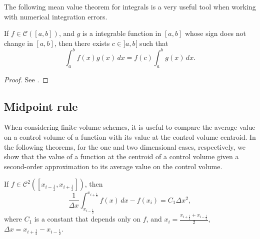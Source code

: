 The following mean value theorem for integrals is a very useful tool 
when working with numerical integration errors.
\begin{thrm}
	\label{anexo-numint-mv}
	If $f \in \mathcal{C}([a,b])$, and $g$ is a integrable function in $[a,b]$
	whose sign does not change in $[a,b]$,
	then there exists $c \in ]a,b[$ such that
	\begin{equation*}
		\int_{a}^{b}f(x)g(x) \,dx = f(c)\int_{a}^{b}g(x) \,dx.
	\end{equation*}
\end{thrm}
\begin{proof}
	See \citet[\pno~143]{courant:1999}.
\end{proof}

\subsection{Midpoint rule}
When considering finite-volume schemes, it is useful to compare the average value on a  control volume 
of a function with its value at the  control volume centroid. 
In the following theorems, for the one and two dimensional cases, respectively,
we show that the value of a function at the centroid of a control volume given a second-order approximation to its average value
on the control volume.
\begin{thrm}
	\label{prop-bound-midpoint1d}
	If $f \in \mathcal{C}^2([x_{i-\frac{1}{2}},x_{i+\frac{1}{2}}])$, then 
	\begin{equation}
		\frac{1}{\Delta x}\int_{x_{i-\frac{1}{2}}}^{x_{i+\frac{1}{2}}}{f(x)\,dx}-f(x_i) = C_1 \Delta x^2, 
	\end{equation}
	where $C_1$ is a constant that depends only on $f$, and $x_i = \frac{x_{i+\frac{1}{2}} + x_{i-\frac{1}{2}}}{2}$,
	$\Delta x = x_{i+\frac{1}{2}}-x_{i-\frac{1}{2}}$.
\end{thrm}
